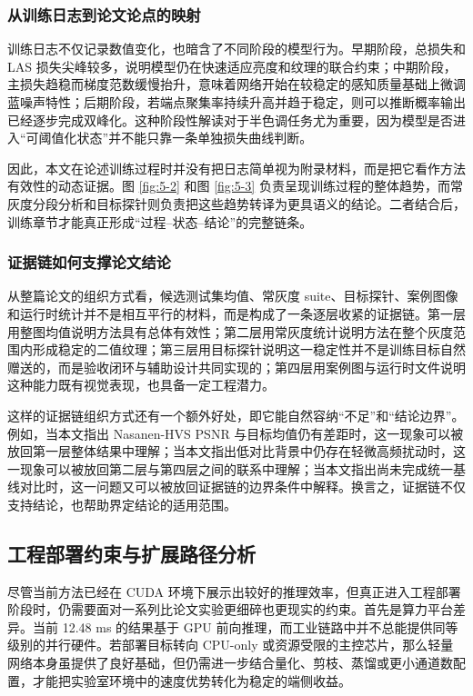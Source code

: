 \documentclass[thesis]{../zstucs-graduation-project}
\begin{document}
\subsubsection{从训练日志到论文论点的映射}
训练日志不仅记录数值变化，也暗含了不同阶段的模型行为。早期阶段，总损失和 LAS 损失尖峰较多，说明模型仍在快速适应亮度和纹理的联合约束；中期阶段，主损失趋稳而梯度范数缓慢抬升，意味着网络开始在较稳定的感知质量基础上微调蓝噪声特性；后期阶段，若端点聚集率持续升高并趋于稳定，则可以推断概率输出已经逐步完成双峰化。这种阶段性解读对于半色调任务尤为重要，因为模型是否进入“可阈值化状态”并不能只靠一条单独损失曲线判断。

因此，本文在论述训练过程时并没有把日志简单视为附录材料，而是把它看作方法有效性的动态证据。图 \ref{fig:5-2} 和图 \ref{fig:5-3} 负责呈现训练过程的整体趋势，而常灰度分段分析和目标探针则负责把这些趋势转译为更具语义的结论。二者结合后，训练章节才能真正形成“过程--状态--结论”的完整链条。

\subsubsection{证据链如何支撑论文结论}
从整篇论文的组织方式看，候选测试集均值、常灰度 suite、目标探针、案例图像和运行时统计并不是相互平行的材料，而是构成了一条逐层收紧的证据链。第一层用整图均值说明方法具有总体有效性；第二层用常灰度统计说明方法在整个灰度范围内形成稳定的二值纹理；第三层用目标探针说明这一稳定性并不是训练目标自然赠送的，而是验收闭环与辅助设计共同实现的；第四层用案例图与运行时文件说明这种能力既有视觉表现，也具备一定工程潜力。

这样的证据链组织方式还有一个额外好处，即它能自然容纳“不足”和“结论边界”。例如，当本文指出 Nasanen-HVS PSNR 与目标均值仍有差距时，这一现象可以被放回第一层整体结果中理解；当本文指出低对比背景中仍存在轻微高频扰动时，这一现象可以被放回第二层与第四层之间的联系中理解；当本文指出尚未完成统一基线对比时，这一问题又可以被放回证据链的边界条件中解释。换言之，证据链不仅支持结论，也帮助界定结论的适用范围。

\subsection{工程部署约束与扩展路径分析}
尽管当前方法已经在 CUDA 环境下展示出较好的推理效率，但真正进入工程部署阶段时，仍需要面对一系列比论文实验更细碎也更现实的约束。首先是算力平台差异。当前 12.48 ms 的结果基于 GPU 前向推理，而工业链路中并不总能提供同等级别的并行硬件。若部署目标转向 CPU-only 或资源受限的主控芯片，那么轻量网络本身虽提供了良好基础，但仍需进一步结合量化、剪枝、蒸馏或更小通道数配置，才能把实验室环境中的速度优势转化为稳定的端侧收益。
\end{document}
